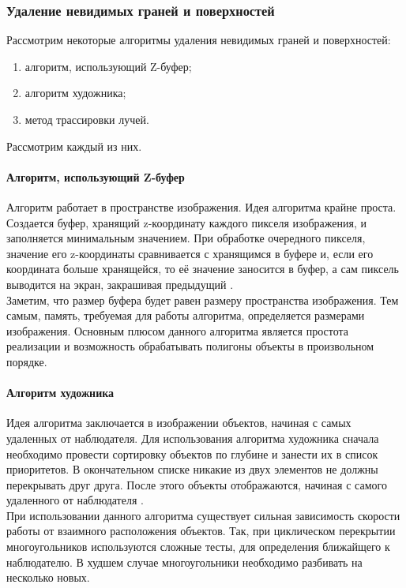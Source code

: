 \documentclass{article}
\begin{document}
	\subsubsection{Удаление невидимых граней и поверхностей}
	\indent Рассмотрим некоторые алгоритмы удаления невидимых граней и поверхностей:
	\begin{enumerate}
		\item алгоритм, использующий Z-буфер;
		\item алгоритм художника;
		\item метод трассировки лучей.
	\end{enumerate}
	Рассмотрим каждый из них.
	\paragraph{ Алгоритм, использующий Z-буфер}
	\indent Алгоритм работает в пространстве изображения. Идея алгоритма крайне проста. Создается буфер, хранящий z-координату каждого пикселя изображения, и заполняется минимальным значением. При обработке очередного пикселя, значение его z-координаты сравнивается с хранящимся в буфере и, если его координата больше хранящейся, то её значение заносится в буфер, а сам пиксель выводится на экран, закрашивая предыдущий \cite{z-buf}.
	\\ \indent Заметим, что размер буфера будет равен размеру пространства изображения. Тем самым, память, требуемая для работы алгоритма, определяется размерами изображения. Основным плюсом данного алгоритма является простота реализации и возможность обрабатывать полигоны объекты в произвольном порядке.
	\paragraph{ Алгоритм художника}
	\indent Идея алгоритма заключается в изображении объектов, начиная с самых удаленных от наблюдателя. Для использования алгоритма художника сначала необходимо провести сортировку объектов по глубине и занести их в список приоритетов. В окончательном списке никакие из двух элементов не должны перекрывать друг друга. После этого объекты отображаются, начиная с самого удаленного от наблюдателя \cite{drawerAlg}.
	\\ \indent При использовании данного алгоритма существует сильная зависимость скорости работы от взаимного расположения объектов. Так, при циклическом перекрытии многоугольников используются сложные тесты, для определения ближайщего к наблюдателю. В худшем случае многоугольники необходимо разбивать на несколько новых.
\end{document}
